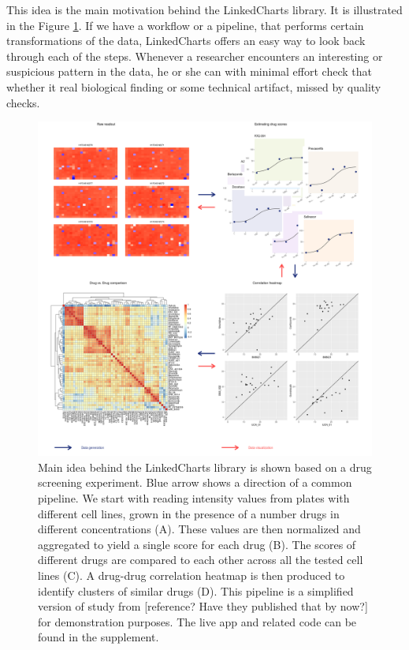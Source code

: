 \documentclass[twocolumn,10pt]{article}
\begin{document}
This idea is the main motivation behind the LinkedCharts library. It is illustrated in the Figure \ref{FigC}. If we have a workflow or a pipeline, that performs certain transformations of the data, LinkedCharts offers an easy way to look back through each of the steps. Whenever a researcher encounters an interesting or suspicious pattern in the data, he or she can with minimal effort check that whether it real biological finding or some technical artifact, missed by quality checks. 

\begin{figure}
	\includegraphics[width=\textwidth]{FigC/figC.png}
	\caption{Main idea behind the LinkedCharts library is shown based on a drug screening experiment. Blue arrow shows a direction of a common pipeline. We start with reading intensity values from plates with different cell lines, grown in the presence of a number drugs in different concentrations (A). These values are then normalized and aggregated to yield a single score for each drug (B). The scores of different drugs are compared to each other across all the tested cell lines (C). A drug-drug correlation heatmap is then produced to identify clusters of similar drugs (D). This pipeline is a simplified version of study from [reference? Have they published that by now?] for demonstration purposes. The live app and related code can be found in the supplement.}
	\label{FigC}
\end{figure}
\end{document}
